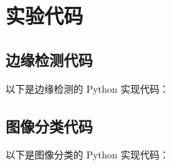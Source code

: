\chapter{实验代码}


\section{边缘检测代码}

以下是边缘检测的 Python 实现代码：


\section{图像分类代码}

以下是图像分类的 Python 实现代码：


